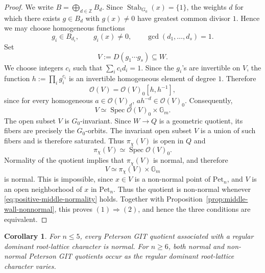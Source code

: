 \documentclass[12pt, reqno]{amsart}
\theoremstyle{plain}
\numberwithin{equation}{section}
\newtheorem{corollary}[theorem]{Corollary}
\theoremstyle{definition}
\begin{document}
\begin{proof}
We write $B=\bigoplus_{d\in\mathbb Z}B_d.$
Since \(\operatorname{Stab}_{G_0}(x)=\{1\}\), the weights \(d\) for
which there exists \(g\in B_d\) with \(g(x)\neq0\) have greatest
common divisor \(1\). Hence we may choose homogeneous functions
\[
g_i\in B_{d_i},
\qquad
g_i(x)\neq0,
\qquad
\gcd(d_1,\ldots,d_s)=1.
\]
Set
\[
V:=D(g_1\cdots g_s)\subseteq W.
\]
We choose integers \(c_i\) such that $\sum_i c_id_i=1.$
Since the \(g_i\)'s are invertible on \(V\), the function $h:=\prod_i g_i^{c_i}$ is an invertible homogeneous element of degree \(1\). Therefore
\[
\mathcal O(V)
=
\mathcal O(V)_0[h,h^{-1}],
\]
since for every homogeneous $a\in\mathcal O(V)_d$, $ah^{-d}\in\mathcal O(V)_0.$
Consequently,
\[
V
\simeq
\operatorname{Spec}\mathcal O(V)_0\times\mathbb G_m.
\]
The open subset \(V\) is \(G_0\)-invariant. Since \(W\to Q\) is a
geometric quotient, its fibers are precisely the \(G_0\)-orbits. The invariant open subset \(V\) is a union of
such fibers and is therefore saturated. Thus \(\pi_\chi(V)\) is open in \(Q\) and
\[
\pi_\chi(V)
\simeq
\operatorname{Spec}\mathcal O(V)_0.
\]
Normality of the quotient implies that \(\pi_\chi(V)\) is normal,
and therefore
\[
V
\simeq
\pi_\chi(V)\times\mathbb G_m
\]
is normal. This is impossible, since \(x\in V\) is a non-normal point
of \(\mathrm{Pet}_n\), and \(V\) is an open neighborhood of \(x\) in
\(\mathrm{Pet}_n\). Thus the quotient is non-normal whenever
\eqref{eq:positive-middle-normality} holds. Together with
Proposition~\ref{prop:middle-wall-nonnormal}, this proves
\((1)\Rightarrow(2)\), and hence the three conditions are equivalent.
\end{proof}

\begin{corollary}\label{cor:normality-small-rank}
For \(n\le5\), every Peterson GIT quotient associated with a regular
dominant root-lattice character is normal. For \(n\ge6\), both normal
and non-normal Peterson GIT quotients occur as the regular dominant
root-lattice character varies.
\end{corollary}
\end{document}
